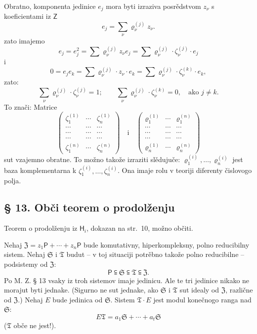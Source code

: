 \documentclass[11pt]{article}
\begin{document}
Obratno, komponenta jedinice \(e_j\) mora byti izraziva posrědstvom \(z_\nu\) s koeficientami iz \(\mathsf Z\)
\[
e_j=\sum_\nu \varrho_\nu^{(j)}z_\nu .
\]
zato imajemo
\[
e_j=e_j^2=\sum \varrho_\nu^{(j)}z_\nu e_j
=\sum \varrho_\nu^{(j)}\cdot\zeta_\nu^{(j)}\cdot e_j
\]
i
\[
0=e_je_k=\sum \varrho_\nu^{(j)}\cdot z_\nu\cdot e_k
=\sum \varrho_\nu^{(j)}\cdot\zeta_\nu^{(k)}\cdot e_k,
\]
zato:
\[
\sum_\nu \varrho_\nu^{(j)}\cdot\zeta_\nu^{(j)}=1;
\qquad
\sum_\nu \varrho_\nu^{(j)}\cdot\zeta_\nu^{(k)}=0,\quad
\text{ako } j\ne k.
\]
To znači: Matrice
\[
\begin{pmatrix}
\zeta_1^{(1)} & \cdots & \zeta_n^{(1)}\\
\cdots & \cdots & \cdots\\
\cdots & \cdots & \cdots\\
\cdots & \cdots & \cdots\\
\zeta_1^{(n)} & \cdots & \zeta_n^{(n)}
\end{pmatrix}
\quad\text{i}\quad
\begin{pmatrix}
\varrho_1^{(1)} & \cdots & \varrho_1^{(n)}\\
\cdots & \cdots & \cdots\\
\cdots & \cdots & \cdots\\
\cdots & \cdots & \cdots\\
\varrho_n^{(1)} & \cdots & \varrho_n^{(n)}
\end{pmatrix}
\]
sut vzajemno obratne. To možno takože izraziti slědujuče: \(\varrho_1^{(i)},\ldots,\varrho_n^{(i)}\) jest baza komplementarna k \(\zeta_1^{(i)},\ldots,\zeta_n^{(i)}\). Ona imaje rolu v teoriji diferenty čislovogo polja.

\subsection*{§ 13. Obči teorem o prodolženju}\label{der-allgemeine-fortsetzungssatz}

Teorem o prodolženju iz \(\mathsf{H}_i\), dokazan na str.~10, možno občiti.

Nehaj \(\mathfrak Z=z_1\mathsf P+\cdots+z_n\mathsf P\) bude komutativny, hiperkompleksny, polno reducibilny sistem. Nehaj \(\mathfrak S\) i \(\mathfrak T\) budut -- v toj situaciji potrěbno takože polno reducibilne -- podsistemy od \(\mathfrak Z\):
\[
\mathsf P\subseteqq\mathfrak S\subseteqq\mathfrak T\subseteqq\mathfrak Z .
\]
Po M. Z. § 13 vsaky iz troh sistemov imaje jedinicu. Ale te tri jedinice nikako ne morajut byti jednake. (Sigurno ne sut jednake, ako \(\mathfrak S\) i \(\mathfrak T\) sut idealy od \(\mathfrak Z\), različne od \(\mathfrak Z\).) Nehaj \(E\) bude jedinica od \(\mathfrak S\). Sistem \(\mathfrak T\cdot E\) jest modul konečnogo ranga nad \(\mathfrak S\):
\[
E\mathfrak T=a_1\mathfrak S+\cdots+a_t\mathfrak S
\]
(\(\mathfrak T\) obče ne jest!).
\end{document}
